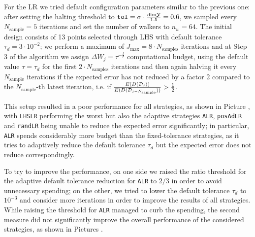 For the LR we tried default configuration parameters similar to the previous one: after setting the halting threshold to $\texttt{tol} = \sigma \cdot \frac{\text{dim} \mathcal Y }{1.5} = 0.6$, we sampled every $N_{\text{sample}} = 5 $ iterations and set the number of walkers to $n_w = 64$.
The initial design consists of 13 points selected through LHS with default tolerance $\tau_d = 3 \cdot 10^{-2}$; we perform a maximum of $J_{\max} = 8 \cdot N_{\text{samples}}$ iterations and at Step 3 of the algorithm we assign $\Delta W_j = \tau ^{-\frac{l}{r}}$ computational budget, using the default value $\tau= \tau_d$ for the first $2\cdot N_{\text{samples}}$ iterations and then again halving it every $N_{\text{sample}}$ iterations if the expected error has not reduced by a factor 2 compared to the $N_{\text{sample}}$-th latest iteration, i.e. if $\frac{E(D(\mathcal D_j))}{E(D(\mathcal D_{j-N_{\text{sample}}}))} > \frac{1}{2}$.

This setup resulted in a poor performance for all strategies, as shown in Picture , with \texttt{LHSLR} performing the worst but also the adaptive strategies \texttt{ALR}, \texttt{posAdLR} and \texttt{randLR} being unable to reduce the expected error significantly; in particular, \texttt{ALR} spends considerably more budget than the fixed-tolerance strategies, as it tries to adaptively reduce the default tolerance $\tau_d$ but the expected error does not reduce correspondingly.

To try to improve the performance, on one side we raised the ratio threshold for the adaptive default tolerance reduction for \texttt{ALR} to $2/3$ in order to avoid unnecessary spending; on the other, we tried to lower the default tolerance $\tau_d$ to $10^{-3}$ and consider more iterations in order to improve the results of all strategies.
While raising the threshold for \texttt{ALR} managed to curb the spending, the second measure did not significantly improve the overall performance of the considered strategies, as shown in Pictures .

